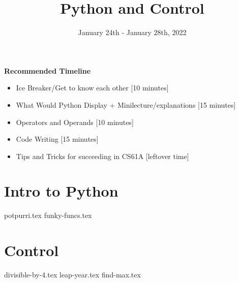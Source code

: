 \documentclass{exam}
\title{Python and Control}
\date{January 24th - January 28th, 2022}
\begin{document}
\maketitle
\begin{guide}
\textbf{Recommended Timeline}
\begin{itemize}
  \item Ice Breaker/Get to know each other [10 minutes]
  \item What Would Python Display + Minilecture/explanations [15 minutes]\item Operators and Operands [10 minutes]
  \item Code Writing [15 minutes]
  \item Tips and Tricks for succeeding in CS61A [leftover time]
\end{itemize}
\end{guide}


\section{Intro to Python}
\begin{questions}
{potpurri.tex}
{funky-funcs.tex}
\end{questions}

\section{Control}
\begin{questions}
{divisible-by-4.tex}
{leap-year.tex}
{find-max.tex}
\end{questions}
\end{document}
